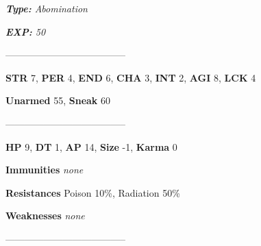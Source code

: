 \documentclass[11pt,a4paper,twocolumn]{book}
\begin{document}
	\noindent
	\emph{\textbf{Type:} Abomination}
	
	\noindent
	\emph{\textbf{EXP:} 50}
	
%		
%	
%		

	--------------------------------------
	
	\noindent
	\textbf{STR} 7, \textbf{PER} 4, \textbf{END} 6, \textbf{CHA} 3, \textbf{INT} 2, \textbf{AGI} 8, \textbf{LCK} 4
	
	\noindent
	\textbf{Unarmed} 55, \textbf{Sneak} 60
	
	--------------------------------------
	
	\noindent
	\textbf{HP} 9, \textbf{DT} 1, \textbf{AP} 14, \textbf{Size} -1, \textbf{Karma} 0
	
	
	\noindent
	\textbf{Immunities} \emph{none}
	
	\noindent
	\textbf{Resistances} Poison 10\%, Radiation 50\%
	
	\noindent
	\textbf{Weaknesses} \emph{none} %
	
	--------------------------------------
	
\end{document}
